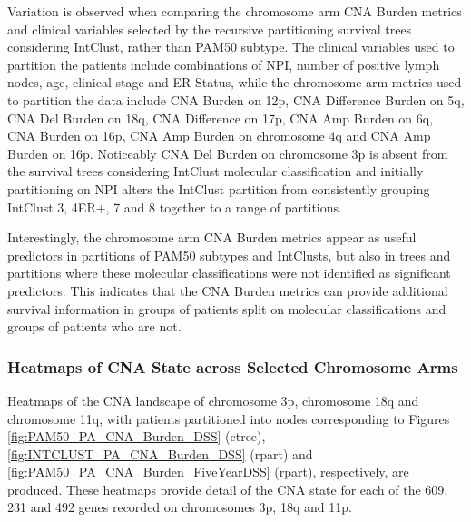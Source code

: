 Variation is observed when comparing the chromosome arm CNA Burden metrics and clinical variables selected by the recursive partitioning survival trees considering \FloatBarrier \noindent IntClust, rather than PAM50 subtype. The clinical variables used to partition the patients include combinations of NPI, number of positive lymph nodes, age, clinical stage and ER Status, while the chromosome arm metrics used to partition the data include CNA Burden on 12p, CNA Difference Burden on 5q, CNA Del Burden on 18q, CNA Difference on 17p, CNA Amp Burden on 6q, CNA Burden on 16p, CNA Amp Burden on chromosome 4q and CNA Amp Burden on 16p. Noticeably CNA Del Burden on chromosome 3p is absent from the survival trees considering IntClust molecular classification and initially partitioning on NPI alters the IntClust partition from consistently grouping IntClust 3, 4ER+, 7 and 8 together to a range of partitions.

Interestingly, the chromosome arm CNA Burden metrics appear as useful predictors in partitions of PAM50 subtypes and IntClusts, but also in trees and partitions where these molecular classifications were not identified as significant predictors. This indicates that the CNA Burden metrics can provide additional survival information in groups of patients split on molecular classifications and groups of patients who are not. 

\subsubsection{Heatmaps of CNA State across Selected Chromosome Arms} 
\label{Heatmaps_Chap3}
Heatmaps of the CNA landscape of chromosome 3p, chromosome 18q and chromosome 11q, with patients partitioned into nodes corresponding to Figures \ref{fig:PAM50_PA_CNA_Burden_DSS} (ctree), \ref{fig:INTCLUST_PA_CNA_Burden_DSS} (rpart) and \ref{fig:PAM50_PA_CNA_Burden_FiveYearDSS} (rpart), respectively, are produced. These heatmaps provide detail of the CNA state for each of the 609, 231 and 492 genes recorded on chromosomes 3p, 18q and 11p. 

